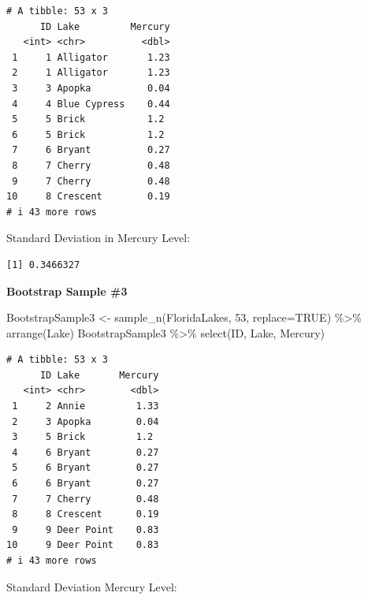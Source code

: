 \documentclass[
  letterpaper,
  DIV=11,
  numbers=noendperiod]{scrreprt}
\newenvironment{Shaded}{\begin{snugshade}}{\end{snugshade}}
\newcommand{\AttributeTok}[1]{\textcolor[rgb]{0.40,0.45,0.13}{#1}}
\newcommand{\ConstantTok}[1]{\textcolor[rgb]{0.56,0.35,0.01}{#1}}
\newcommand{\DecValTok}[1]{\textcolor[rgb]{0.68,0.00,0.00}{#1}}
\newcommand{\FunctionTok}[1]{\textcolor[rgb]{0.28,0.35,0.67}{#1}}
\newcommand{\NormalTok}[1]{\textcolor[rgb]{0.00,0.23,0.31}{#1}}
\newcommand{\OtherTok}[1]{\textcolor[rgb]{0.00,0.23,0.31}{#1}}
\newcommand{\SpecialCharTok}[1]{\textcolor[rgb]{0.37,0.37,0.37}{#1}}
\begin{document}
\begin{verbatim}
# A tibble: 53 x 3
      ID Lake         Mercury
   <int> <chr>          <dbl>
 1     1 Alligator       1.23
 2     1 Alligator       1.23
 3     3 Apopka          0.04
 4     4 Blue Cypress    0.44
 5     5 Brick           1.2 
 6     5 Brick           1.2 
 7     6 Bryant          0.27
 8     7 Cherry          0.48
 9     7 Cherry          0.48
10     8 Crescent        0.19
# i 43 more rows
\end{verbatim}

Standard Deviation in Mercury Level:

\begin{Shaded}
\end{Shaded}

\begin{verbatim}
[1] 0.3466327
\end{verbatim}

\textbf{Bootstrap Sample \#3}

\begin{Shaded}
\begin{Highlighting}[]
\NormalTok{BootstrapSample3 }\OtherTok{\textless{}{-}} \FunctionTok{sample\_n}\NormalTok{(FloridaLakes, }\DecValTok{53}\NormalTok{, }\AttributeTok{replace=}\ConstantTok{TRUE}\NormalTok{) }\SpecialCharTok{\%\textgreater{}\%} \FunctionTok{arrange}\NormalTok{(Lake)}
\NormalTok{BootstrapSample3 }\SpecialCharTok{\%\textgreater{}\%} \FunctionTok{select}\NormalTok{(ID, Lake, Mercury)}
\end{Highlighting}
\end{Shaded}

\begin{verbatim}
# A tibble: 53 x 3
      ID Lake       Mercury
   <int> <chr>        <dbl>
 1     2 Annie         1.33
 2     3 Apopka        0.04
 3     5 Brick         1.2 
 4     6 Bryant        0.27
 5     6 Bryant        0.27
 6     6 Bryant        0.27
 7     7 Cherry        0.48
 8     8 Crescent      0.19
 9     9 Deer Point    0.83
10     9 Deer Point    0.83
# i 43 more rows
\end{verbatim}

Standard Deviation Mercury Level:

\begin{Shaded}
\end{Shaded}
\end{document}
